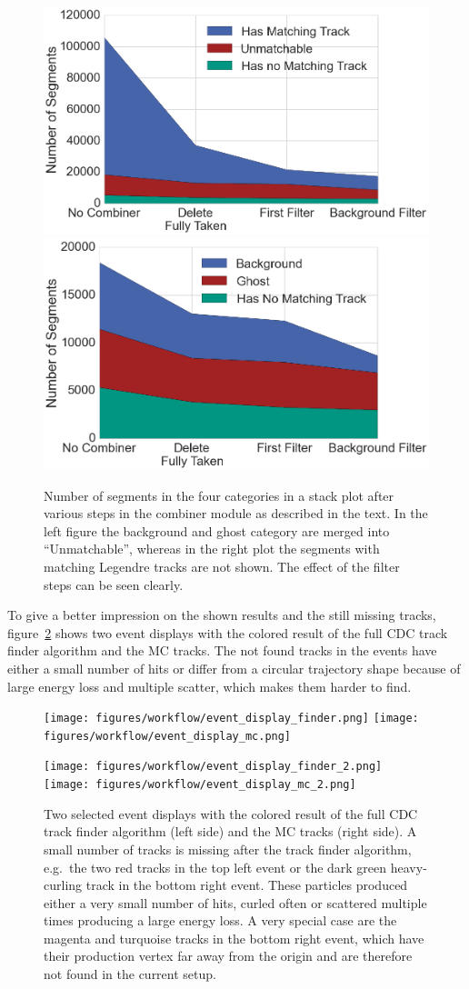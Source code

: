 \begin{figure}
  \centering
  \includegraphics[width=0.48\linewidth]{figures/workflow/remaining_segments_full.png}
  \includegraphics[width=0.48\linewidth]{figures/workflow/remaining_segments_detail.png}
  \caption{Number of segments in the four categories in a stack plot after various steps in the combiner module as described in the text. In the left figure the background and ghost category are merged into ``Unmatchable'', whereas in the right plot the segments with matching Legendre tracks are not shown. The effect of the filter steps can be seen clearly.}
  \label{fig-remaining-segments-full}
\end{figure}

To give a better impression on the shown results and the still missing tracks, figure~\ref{fig-event-displays-final} shows two event displays with the colored result of the full CDC track finder algorithm and the MC tracks. The not found tracks in the events have either a small number of hits or differ from a circular trajectory shape because of large energy loss and multiple scatter, which makes them harder to find.

\begin{figure}
  \centering
  \texttt{[image: figures/workflow/event\_display\_finder.png]}
  \texttt{[image: figures/workflow/event\_display\_mc.png]}

  \texttt{[image: figures/workflow/event\_display\_finder\_2.png]}
  \texttt{[image: figures/workflow/event\_display\_mc\_2.png]}
  \caption{Two selected event displays with the colored result of the full CDC track finder algorithm (left side) and the MC tracks (right side). A small number of tracks is missing after the track finder algorithm, e.g.\ the two red tracks in the top left event or the dark green heavy-curling track in the bottom right event. These particles produced either a very small number of hits, curled often or scattered multiple times producing a large energy loss. A very special case are the magenta and turquoise tracks in the bottom right event, which have their production vertex far away from the origin and are therefore not found in the current setup.}
  \label{fig-event-displays-final}
\end{figure}


